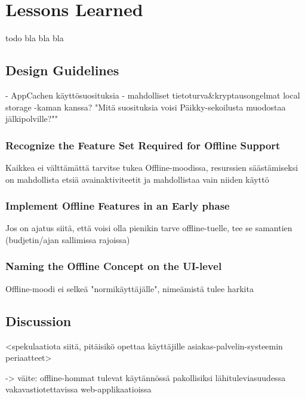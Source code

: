 \chapter{Lessons Learned}
todo bla bla bla



\section{Design Guidelines}
- AppCachen käyttösuosituksia
- mahdolliset tietoturva&kryptausongelmat local storage -kaman kanssa?
"Mitä suosituksia voisi Päikky-sekoilusta muodostaa jälkipolville?""

\subsection{Recognize the Feature Set Required for Offline Support}
Kaikkea ei välttämättä tarvitse tukea Offline-moodissa, resurssien säästämiseksi on mahdollista etsiä avainaktiviteetit ja mahdollistaa vain niiden käyttö


\subsection{Implement Offline Features in an Early phase}
Jos on ajatus siitä, että voisi olla pienikin tarve offline-tuelle, tee se samantien (budjetin/ajan sallimissa rajoissa)

\subsection{Naming the Offline Concept on the UI-level}
Offline-moodi ei selkeä "normikäyttäjälle", nimeämistä tulee harkita



\section{Discussion}

<spekulaatiota siitä, pitäisikö opettaa käyttäjille asiakas-palvelin-systeemin periaatteet>


-> väite: offline-hommat tulevat käytännössä pakollisiksi lähituleviasuudessa vakavastiotettavissa web-applikaatioissa




